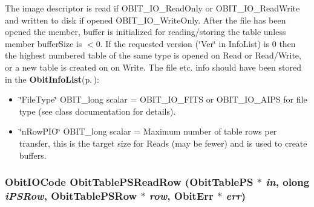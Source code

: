 The image descriptor is read if OBIT\_\-IO\_\-Read\-Only or OBIT\_\-IO\_\-Read\-Write and written to disk if opened OBIT\_\-IO\_\-Write\-Only. After the file has been opened the member, buffer is initialized for reading/storing the table unless member buffer\-Size is $<$0. If the requested version (\char`\"{}Ver\char`\"{} in Info\-List) is 0 then the highest numbered table of the same type is opened on Read or Read/Write, or a new table is created on on Write. The file etc. info should have been stored in the {\bf Obit\-Info\-List}{\rm (p.\,\pageref{structObitInfoList})}: \begin{itemize}
\item \char`\"{}File\-Type\char`\"{} OBIT\_\-long scalar = OBIT\_\-IO\_\-FITS or OBIT\_\-IO\_\-AIPS for file type (see class documentation for details). \item \char`\"{}n\-Row\-PIO\char`\"{} OBIT\_\-long scalar = Maximum number of table rows per transfer, this is the target size for Reads (may be fewer) and is used to create buffers. 
\end{itemize}
\subsubsection{\setlength{\rightskip}{0pt plus 5cm}Obit\-IOCode Obit\-Table\-PSRead\-Row ({\bf Obit\-Table\-PS} $\ast$ {\em in}, {\bf olong} {\em i\-PSRow}, {\bf Obit\-Table\-PSRow} $\ast$ {\em row}, {\bf Obit\-Err} $\ast$ {\em err})}\label{ObitTablePS_8c_a22}


